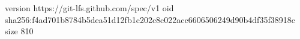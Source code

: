 version https://git-lfs.github.com/spec/v1
oid sha256:f4ad701b8784b5dea51d12fb1c202c8c022acc6606506249d90b4df35f38918c
size 810
